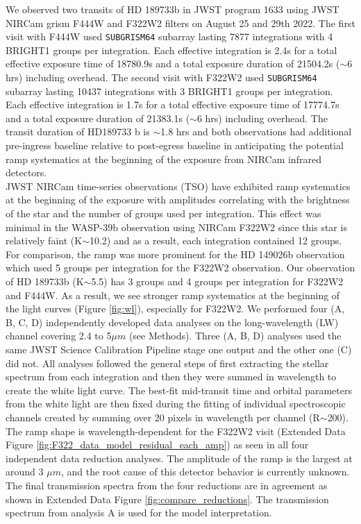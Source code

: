 \documentclass[sn-standardnature]{sn-jnl}%
\begin{document}
We observed two transits of HD 189733b in JWST program 1633 using JWST NIRCam grism F444W and F322W2 filters on August 25 and 29th 2022. The first visit with F444W used \texttt{SUBGRISM64} subarray lasting 7877 integrations with 4 BRIGHT1 groups per integration. Each effective integration is 2.4s for a total effective exposure time of 18780.9s and a total exposure duration of 21504.2s ($\sim$6 hrs) including overhead. The second visit with F322W2 used \texttt{SUBGRISM64} subarray lasting 10437 integrations with 3 BRIGHT1 groups per integration. Each effective integration is 1.7s for a total effective exposure time of 17774.7s and a total exposure duration of 21383.1s ($\sim$6 hrs) including overhead.  The transit duration of HD189733 b is $\sim$1.8 hrs and both observations had additional pre-ingress baseline relative to post-egress baseline in anticipating the potential ramp systematics at the beginning of the exposure from NIRCam infrared detectors. \\

JWST NIRCam time-series observations (TSO) have exhibited ramp systematics at the beginning of the exposure with amplitudes correlating with the brightness of the star and the number of groups used per integration. This effect was minimal in the WASP-39b observation using NIRCam F322W2 \cite{ahrer_early_2022} since this star is relatively faint (K$\sim$10.2) and as a result, each integration contained 12 groups. For comparison, the ramp was more prominent for the HD 149026b observation \cite{bean_high_2023} which used 5 groups per integration for the F322W2 observation. Our observation of HD 189733b (K$\sim$5.5) has 3 groups and 4 groups per integration for F322W2 and F444W. As a result, we see stronger ramp systematics at the beginning of the light curves (Figure \ref{fig:wl}), especially for F322W2. We performed four (A, B, C, D) independently developed data analyses on the long-wavelength (LW) channel covering 2.4 to 5$\mu m$ (see Methods). Three (A, B, D) analyses used the same JWST Science Calibration Pipeline stage one output and the other one (C) did not. All analyses followed the general steps of first extracting the stellar spectrum from each integration and then they were summed in wavelength to create the white light curve. The best-fit mid-transit time and orbital parameters from the white light are then fixed during the fitting of individual spectroscopic channels created by summing over 20 pixels in wavelength per channel (R$\sim$200). The ramp shape is wavelength-dependent for the F322W2 visit (Extended Data Figure \ref{fig:F322_data_model_residual_each_amp}) as seen in all four independent data reduction analyses. The amplitude of the ramp is the largest at around 3 $\mu m$, and the root cause of this detector behavior is currently unknown. The final transmission spectra from the four reductions are in agreement as shown in Extended Data Figure \ref{fig:compare_reductions}. The transmission spectrum from analysis A is used for the model interpretation. \\
\end{document}
